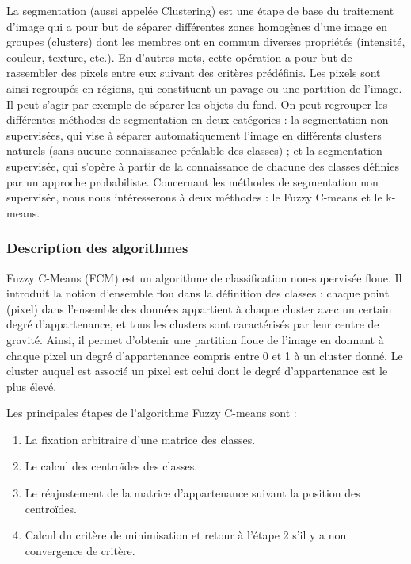 La segmentation (aussi appelée Clustering) est une étape de base du traitement d’image qui a pour but de séparer différentes zones homogènes d’une image en groupes (clusters) dont les membres ont en commun diverses propriétés (intensité, couleur, texture, etc.). En d’autres mots, cette opération a pour but de rassembler des pixels entre eux suivant des critères prédéfinis. Les pixels sont ainsi regroupés en régions, qui constituent un pavage ou une partition de l'image. Il peut s'agir par exemple de séparer les objets du fond. On peut regrouper les différentes méthodes de segmentation en deux catégories : la segmentation non supervisées, qui vise à séparer automatiquement l’image en différents clusters naturels (sans aucune connaissance préalable des classes) ; et la segmentation supervisée, qui s’opère à partir de la connaissance de chacune des classes définies par un approche probabiliste. Concernant les méthodes de segmentation non supervisée, nous nous intéresserons à deux méthodes : le Fuzzy C-means et le k-means. 

\subsubsection*{Description des algorithmes}
Fuzzy C-Means (FCM) est un algorithme de classification non-supervisée floue. Il introduit la notion d’ensemble flou dans la définition des classes : chaque point (pixel) dans l’ensemble des données appartient à chaque cluster avec un certain degré d’appartenance, et tous les clusters sont caractérisés par leur centre de gravité. Ainsi, il permet d’obtenir une partition floue de l’image en donnant à chaque pixel un degré d’appartenance compris entre 0 et 1 à un cluster donné. Le cluster auquel est associé un pixel est celui dont le degré d’appartenance est le plus élevé.

Les principales étapes de l’algorithme Fuzzy C-means sont :
\begin{enumerate}
\item La fixation arbitraire d’une matrice des classes.
\item Le calcul des centroïdes des classes.
\item Le réajustement de la matrice d’appartenance suivant la position des centroïdes.
\item Calcul du critère de minimisation et retour à l’étape 2 s’il y a non convergence de critère.
\end{enumerate}
